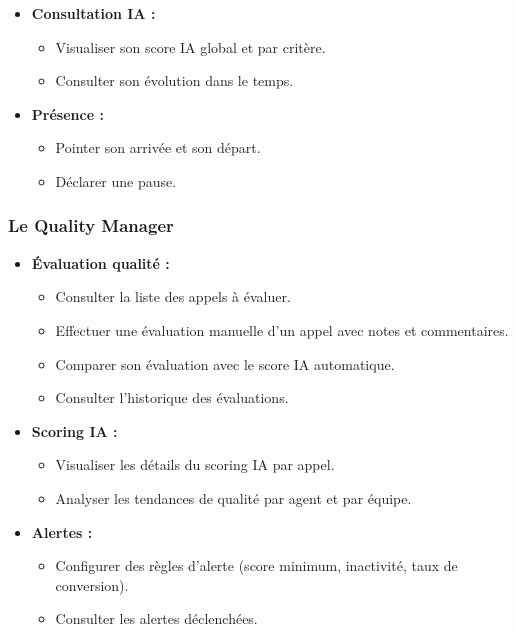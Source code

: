\begin{itemize}[label=--, itemsep=3pt]
    \item \textbf{Consultation IA :}
    \begin{itemize}[label=--, itemsep=2pt]
        \item Visualiser son score IA global et par critère.
        \item Consulter son évolution dans le temps.
    \end{itemize}

    \item \textbf{Présence :}
    \begin{itemize}[label=--, itemsep=2pt]
        \item Pointer son arrivée et son départ.
        \item Déclarer une pause.
    \end{itemize}
\end{itemize}

\subsubsection{Le Quality Manager}

\begin{itemize}[label=--, itemsep=3pt]
    \item \textbf{Évaluation qualité :}
    \begin{itemize}[label=--, itemsep=2pt]
        \item Consulter la liste des appels à évaluer.
        \item Effectuer une évaluation manuelle d'un appel avec notes et commentaires.
        \item Comparer son évaluation avec le score IA automatique.
        \item Consulter l'historique des évaluations.
    \end{itemize}

    \item \textbf{Scoring IA :}
    \begin{itemize}[label=--, itemsep=2pt]
        \item Visualiser les détails du scoring IA par appel.
        \item Analyser les tendances de qualité par agent et par équipe.
    \end{itemize}

    \item \textbf{Alertes :}
    \begin{itemize}[label=--, itemsep=2pt]
        \item Configurer des règles d'alerte (score minimum, inactivité, taux de conversion).
        \item Consulter les alertes déclenchées.
    \end{itemize}
\end{itemize}

